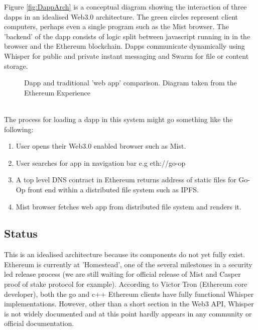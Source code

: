 Figure \ref{fig:DappArch} is a conceptual diagram showing the interaction of three dapps in an idealised Web3.0 architecture. The green circles represent client computers, perhaps even a single program such as the Mist browser. The 'backend' of the dapp consists of logic split between javascript running in in the browser and the Ethereum blockchain. Dapps communicate dynamically using Whisper for public and private instant messaging and Swarm for file or content storage.\\
\begin{figure}
\centering
{}
\decoRule
\caption[Web App v Dapp]{Dapp and traditional 'web app' comparison. Diagram taken from the Ethereum Experience \cite{Web3Slides}}
\label{fig:DappVWeb}
\end{figure}
\\
The process for loading a dapp in this system might go something like the following:\\
\begin{enumerate}
\item User opens their Web3.0 enabled browser such as Mist.
\item User searches for app in navigation bar e.g eth://go-op
\item A top level DNS contract in Ethereum returns address of static files for Go-Op front end within a distributed file system such as IPFS.
\item Mist browser fetches web app from distributed file system and renders it.
\end{enumerate}

\subsection{Status}
This is an idealised architecture because its components do not yet fully exist. Ethereum is currently at 'Homestead', one of the several milestones in a security led release process\cite{VinayLaunch} (we are still waiting for official release of Mist and Casper proof of stake protocol for example). According to Victor Tron (Ethereum core developer), both the go and c++ Ethereum clients have fully functional Whisper implementations\cite{TronStack}. However, other than a short section in the Web3 API, Whisper is not widely documented and at this point hardly appears in any community or official documentation.\\

